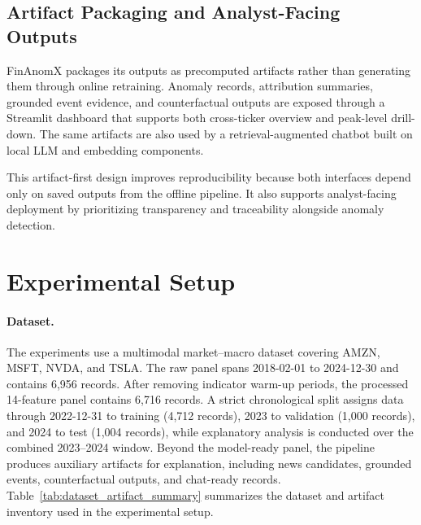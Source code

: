 \documentclass[11pt,a4paper,twoside]{article}
\begin{document}
\subsection{Artifact Packaging and Analyst-Facing Outputs}

FinAnomX packages its outputs as precomputed artifacts rather than generating them through online retraining. Anomaly records, attribution summaries, grounded event evidence, and counterfactual outputs are exposed through a Streamlit dashboard that supports both cross-ticker overview and peak-level drill-down. The same artifacts are also used by a retrieval-augmented chatbot built on local LLM and embedding components.

This artifact-first design improves reproducibility because both interfaces depend only on saved outputs from the offline pipeline. It also supports analyst-facing deployment by prioritizing transparency and traceability alongside anomaly detection.

\section{Experimental Setup}

\paragraph{Dataset.}
The experiments use a multimodal market--macro dataset covering AMZN, MSFT, NVDA, and TSLA. The raw panel spans 2018-02-01 to 2024-12-30 and contains 6,956 records. After removing indicator warm-up periods, the processed 14-feature panel contains 6,716 records. A strict chronological split assigns data through 2022-12-31 to training (4,712 records), 2023 to validation (1,000 records), and 2024 to test (1,004 records), while explanatory analysis is conducted over the combined 2023--2024 window. Beyond the model-ready panel, the pipeline produces auxiliary artifacts for explanation, including news candidates, grounded events, counterfactual outputs, and chat-ready records. Table~\ref{tab:dataset_artifact_summary} summarizes the dataset and artifact inventory used in the experimental setup.
\end{document}
